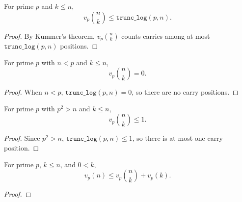 
\begin{lemma}
  \label{lem:logn_bin_le_trunc_log}
  \rocqok
  For prime $p$ and $k \leq n$,
  \[
    v_p\!\binom{n}{k} \leq \texttt{trunc\_log}(p, n).
  \]
  \begin{proof}
    \rocqok
    By Kummer's theorem, $v_p\binom{n}{k}$ counts carries among at
    most $\texttt{trunc\_log}(p, n)$ positions.
  \end{proof}
\end{lemma}

\begin{lemma}
  \label{lem:logn_bin_eq0}
  \rocqok
  For prime $p$ with $n < p$ and $k \leq n$,
  \[
    v_p\!\binom{n}{k} = 0.
  \]
  \begin{proof}
    \rocqok
    When $n < p$, $\texttt{trunc\_log}(p, n) = 0$, so there are no
    carry positions.
  \end{proof}
\end{lemma}

\begin{lemma}
  \label{lem:logn_bin_le1}
  \rocqok
  For prime $p$ with $p^2 > n$ and $k \leq n$,
  \[
    v_p\!\binom{n}{k} \leq 1.
  \]
  \begin{proof}
    \rocqok
    Since $p^2 > n$, $\texttt{trunc\_log}(p, n) \leq 1$, so there
    is at most one carry position.
  \end{proof}
\end{lemma}

\begin{lemma}
  \label{lem:logn_le_logn_bin_add}
  \rocqok
  For prime $p$, $k \leq n$, and $0 < k$,
  \[
    v_p(n) \leq v_p\!\binom{n}{k} + v_p(k).
  \]
  \begin{proof}
    \rocqok
  \end{proof}
\end{lemma}

